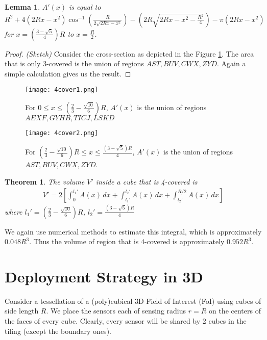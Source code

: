\documentclass[conference]{IEEEtran}
\newtheorem{lemma}{Lemma}
\newtheorem{theorem}{Theorem}
\begin{document}
\begin{lemma}
$A'(x)$ is equal to $R^2 + 4(2Rx -x^2) \cos^{-1} \left(\frac{R}{2\sqrt{2Rx-x^2}} \right) - \left(2R\sqrt{2Rx - x^2 -\frac{R^2}{4}} \right) 
-\pi(2Rx - x^2)$ for $x = (\frac{3 - \sqrt{5}}{4})R$ to $x= \frac{R}{2}$.
\end{lemma}
\begin{proof}
\emph{(Sketch)} Consider the cross-section as depicted in the Figure \ref{z5}. The area that is only 3-covered is the union of regions $AST,BUV,CWX, ZYD$. 
Again a simple calculation gives us the result.   
\end{proof}

\begin{figure}
\centering
\texttt{[image: 4cover1.png]}
\caption{For $0 \leq x \leq (\frac{2}{3} - \frac{\sqrt{10}}{6})R$, $A'(x)$ is the union of regions $AEXF, GYHB, TICJ, LSKD$}
\label{z5}
\end{figure}


\begin{figure}
\centering
\texttt{[image: 4cover2.png]}
\caption{For $(\frac{2}{3} - \frac{\sqrt{10}}{6})R \leq x \leq  \frac{(3 - \sqrt{5})R}{4}$, $A'(x)$ is the union of regions $AST,BUV,CWX, ZYD$.}
\label{z6}
\end{figure}

\begin{theorem}
The volume $V'$ inside a cube that is 4-covered is   
\begin{eqnarray*}
V' = 2 \left[ \int^{l_1'}_{0} A(x)\,dx +  \int^{l_2'}_{l_1'} A(x)\,dx +  \int^{R/2}_{l_2'} A(x)\,dx \right]
\end{eqnarray*}
where $l_1' = (\frac{2}{3} - \frac{\sqrt{10}}{6})R$, $l_2' = \frac{(3 - \sqrt{5})R}{4}$
\end{theorem}

We again use numerical methods to estimate this integral, which is approximately $0.048 R^3$.
Thus the volume of region that is 4-covered is approximately $0.952 R^3$.

\section{Deployment Strategy in 3D}

Consider a tessellation of a (poly)cubical 3D Field of Interest (FoI) using cubes
of side length $R$. We place the sensors each of sensing radius
$r = R$ on the centers of the faces of every cube.
Clearly, every sensor will be shared by 2 cubes in the tiling (except the boundary ones).
\end{document}
